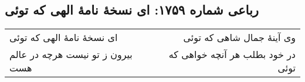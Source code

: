 \begin{center}
\section*{رباعی شماره ۱۷۵۹: ای نسخهٔ نامهٔ الهی که توئی}
\label{sec:1759}
\begin{longtable}{l p{0.5cm} r}
ای نسخهٔ نامهٔ الهی که توئی
&&
وی آینهٔ جمال شاهی که توئی
\\
بیرون ز تو نیست هرچه در عالم هست
&&
در خود بطلب هر آنچه خواهی که توئی
\\
\end{longtable}
\end{center}
